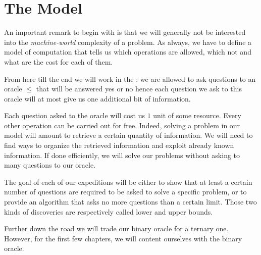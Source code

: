 \section{The Model}
\label{tree:sorting:model}

An important remark to begin with is that we will generally not be interested
into the \emph{machine-world} complexity of a problem. As always, we have to
define a model of computation that tells us which operations are allowed, which
not and what are the cost for each of them.

From here till the end we will work in the :
we are allowed to ask questions to an oracle \(\le\) that will be answered yes or
no hence each question we ask to this oracle will at most give us one
additional bit of information.

Each question asked to the oracle will cost us $1$ unit of some resource.
Every other operation can be carried out for free. Indeed, solving a problem in
our model will amount to retrieve a certain quantity of information. We will
need to find ways to organize the retrieved information and exploit already
known information. If done efficiently, we will solve our problems without
asking to many questions to our oracle.

The goal of each of our expeditions will be either to show that at least a
certain number of questions are required to be asked to solve a specific
problem, or to provide an algorithm that asks no more questions than a certain
limit. Those two kinds of discoveries are respectively called lower and upper
bounds.

Further down the road we will trade our binary oracle for a
ternary one. However, for the first few chapters, we will content ourselves
with the binary oracle.
